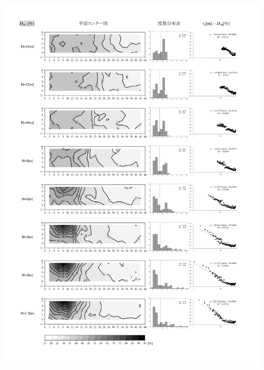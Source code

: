       \begin{minipage}{1\textwidth}
        \centering
          \includegraphics[keepaspectratio,width=1\hsize,angle=0]
                          {04_att/Onkyo_rec2.pdf}
      \end{minipage}
\newpage
